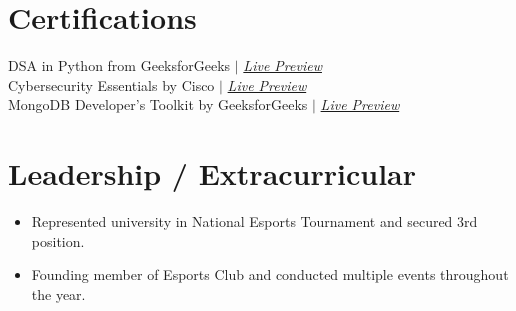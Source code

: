 \documentclass[letterpaper,11pt]{article}
\newcommand{\resumeItem}[1]{
  \item\small{
    {#1 \vspace{-2pt}}
  }
}
\newcommand{\resumeSubHeadingListStart}{\begin{itemize}[leftmargin=0.0in, label={}]}
\newcommand{\resumeSubHeadingListEnd}{\end{itemize}}
\newcommand{\resumeItemListStart}{\begin{itemize}}
\newcommand{\resumeItemListEnd}{\end{itemize}\vspace{-5pt}}
\begin{document}
%
\section{Certifications}
 \begin{itemize}[leftmargin=0.15in, label={}]
    \small{\item{
     DSA in Python from GeeksforGeeks $|$ \emph{\href{https://www.geeksforgeeks.org/certificate/3b0f13e03396f2d6eb175d2a0f0a7d3c}{Live Preview}} \\
     Cybersecurity Essentials by Cisco $|$ \emph{\href{https://www.linkedin.com/in/chiragbisht/details/certifications/1724493812434/single-media-viewer/?profileId=ACoAADkmcikB-Tw6lrnhytASCj9UZzOyYQKePfM}{Live Preview}}\\
     MongoDB Developer's Toolkit by GeeksforGeeks $|$ \emph{\href{https://www.geeksforgeeks.org/certificate/83da2679f0e0eacf29f89c20f4ff3a1e}{Live Preview}} }}
 \end{itemize}
 \vspace{-16pt}


\section{Leadership / Extracurricular}
    \resumeSubHeadingListStart
        
            \resumeItemListStart
                \resumeItem{Represented university in National Esports Tournament and secured 3rd position.}
                \resumeItem{Founding member of Esports Club and conducted multiple events throughout the year.}
                
            \resumeItemListEnd
        
    \resumeSubHeadingListEnd
\end{document}
